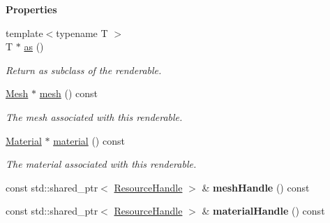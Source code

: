 \begin{Indent}\textbf{ Properties}\par
\begin{DoxyCompactItemize}
\item 
\mbox{\label{classrev_1_1_renderable_a3991d71c4a25e42d586f0614bfa4ded6}} 
{\footnotesize template$<$typename T $>$ }\\T $\ast$ \mbox{\hyperlink{classrev_1_1_renderable_a3991d71c4a25e42d586f0614bfa4ded6}{as}} ()
\begin{DoxyCompactList}\small\item\em Return as subclass of the renderable. \end{DoxyCompactList}\item 
\mbox{\label{classrev_1_1_renderable_a353c19ed75be285e098c03b75dc31b1f}} 
\mbox{\hyperlink{classrev_1_1_mesh}{Mesh}} $\ast$ \mbox{\hyperlink{classrev_1_1_renderable_a353c19ed75be285e098c03b75dc31b1f}{mesh}} () const
\begin{DoxyCompactList}\small\item\em The mesh associated with this renderable. \end{DoxyCompactList}\item 
\mbox{\label{classrev_1_1_renderable_a6bbd903ae2970a92510e4dc8675dd361}} 
\mbox{\hyperlink{classrev_1_1_material}{Material}} $\ast$ \mbox{\hyperlink{classrev_1_1_renderable_a6bbd903ae2970a92510e4dc8675dd361}{material}} () const
\begin{DoxyCompactList}\small\item\em The material associated with this renderable. \end{DoxyCompactList}\item 
\mbox{\label{classrev_1_1_renderable_af2724587c44155e7e4f7f74c81f580cd}} 
const std\+::shared\+\_\+ptr$<$ \mbox{\hyperlink{classrev_1_1_resource_handle}{Resource\+Handle}} $>$ \& {\bfseries mesh\+Handle} () const
\item 
\mbox{\label{classrev_1_1_renderable_ab8386d2e3720caed2f1680f67fc9388a}} 
const std\+::shared\+\_\+ptr$<$ \mbox{\hyperlink{classrev_1_1_resource_handle}{Resource\+Handle}} $>$ \& {\bfseries material\+Handle} () const
\end{DoxyCompactItemize}
\end{Indent}
